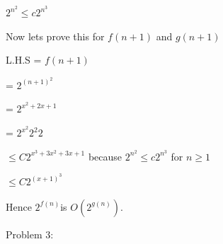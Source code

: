 \documentclass[letterpaper,portrait,12pt]{article}
\begin{document}
\begin{flushleft}

\end{flushleft}


\begin{flushleft}
$2^{n^2} \le c  2^{n^3}$
\end{flushleft}


\begin{flushleft}

\end{flushleft}


\begin{flushleft}
Now lets prove this for $f(n+1)$ and $g(n+1)$
\end{flushleft}


\begin{flushleft}

\end{flushleft}


\begin{flushleft}
L.H.S  = $f(n+1)$
\end{flushleft}


\begin{flushleft}
	= $2^{(n+1)^2}$
\end{flushleft}


\begin{flushleft}
	= $2^{x^2+2x+1}$
\end{flushleft}


\begin{flushleft}
	= $2^{x^2} 2^2 2$
\end{flushleft}


\begin{flushleft}
	$\le C 2^{x^3 + 3x^2+3x +1}$ because $2^{n^2} \le c  2^{n^3}$ for $n\ge1$
\end{flushleft}


\begin{flushleft}
	$\le C 2^{(x+1)^3}$
\end{flushleft}


\begin{flushleft}
Hence  $2^{f(n)}$is $O(2^{g(n)})$. 
\end{flushleft}


\begin{flushleft}

\end{flushleft}


\begin{flushleft}
Problem 3:
\end{flushleft}
\end{document}
